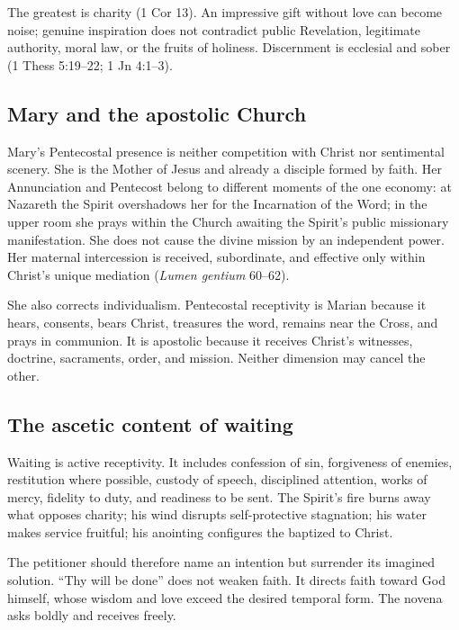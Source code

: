 The greatest is charity (1 Cor 13). An impressive gift without love can become noise; genuine inspiration does not contradict public Revelation, legitimate authority, moral law, or the fruits of holiness. Discernment is ecclesial and sober (1 Thess 5:19--22; 1 Jn 4:1--3).

\subsection{Mary and the apostolic Church}

Mary's Pentecostal presence is neither competition with Christ nor sentimental scenery. She is the Mother of Jesus and already a disciple formed by faith. Her Annunciation and Pentecost belong to different moments of the one economy: at Nazareth the Spirit overshadows her for the Incarnation of the Word; in the upper room she prays within the Church awaiting the Spirit's public missionary manifestation. She does not cause the divine mission by an independent power. Her maternal intercession is received, subordinate, and effective only within Christ's unique mediation (\textit{Lumen gentium} 60--62).

She also corrects individualism. Pentecostal receptivity is Marian because it hears, consents, bears Christ, treasures the word, remains near the Cross, and prays in communion. It is apostolic because it receives Christ's witnesses, doctrine, sacraments, order, and mission. Neither dimension may cancel the other.

\subsection{The ascetic content of waiting}

Waiting is active receptivity. It includes confession of sin, forgiveness of enemies, restitution where possible, custody of speech, disciplined attention, works of mercy, fidelity to duty, and readiness to be sent. The Spirit's fire burns away what opposes charity; his wind disrupts self-protective stagnation; his water makes service fruitful; his anointing configures the baptized to Christ.

The petitioner should therefore name an intention but surrender its imagined solution. “Thy will be done” does not weaken faith. It directs faith toward God himself, whose wisdom and love exceed the desired temporal form. The novena asks boldly and receives freely.
